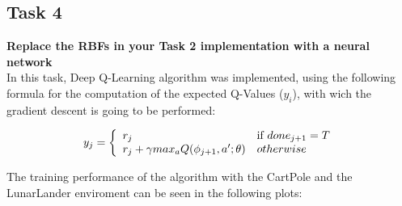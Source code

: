 \documentclass[12pt]{article}
\begin{document}
\subsection{Task 4}
\textbf{Replace the RBFs in your Task 2 implementation with a neural network}\\

In this task, Deep Q-Learning algorithm was implemented, using the following formula for the computation of the expected Q-Values ($y_i$), with wich the gradient descent is going to be performed:

\begin{equation}
    y_j = \left\lbrace
                \begin{array}{ll}
                    r_j & \textup{if } done_{j+1} = T\\
                    r_j + \gamma max_aQ(\phi_{j+1}, a'; \theta) & otherwise
                \end{array}
            \right.
\end{equation}

The training performance of the algorithm with the CartPole and the LunarLander enviroment can be seen in the following plots:
\end{document}
